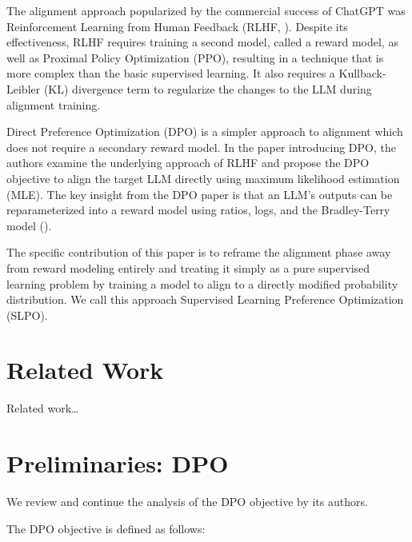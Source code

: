 \documentclass[twoside,11pt]{article}
\begin{document}
The alignment approach popularized by the commercial success of ChatGPT was 
Reinforcement Learning from Human Feedback (RLHF, \cite{ouyang2022training}). 
Despite its effectiveness, RLHF requires training a second model, called
a reward model, as well as Proximal Policy Optimization (PPO), resulting in a 
technique that is more complex than the basic supervised learning. It also
requires a Kullback-Leibler (KL) divergence term to regularize the
changes to the LLM during alignment training.

Direct Preference Optimization (DPO) is a simpler approach to alignment
which does not require a secondary reward model. In the paper introducing
DPO, the authors examine the underlying
approach of RLHF and propose
the DPO objective to align the target LLM directly using
maximum likelihood estimation (MLE). 
The key insight from the DPO paper is that an LLM's
outputs can be reparameterized into a reward model using ratios, logs,
and the Bradley-Terry model (\cite{bradley1952rank}).

The specific contribution of this paper is to reframe the alignment
phase away from reward modeling entirely and treating it simply as
a pure supervised learning problem by training a model to align to
a directly modified probability distribution. We call this
approach Supervised Learning Preference Optimization (SLPO).

\section{Related Work}

Related work\dots

\section{Preliminaries: DPO}

We review and continue the analysis of the DPO objective by its 
authors.

The DPO objective is defined as follows:
\end{document}

